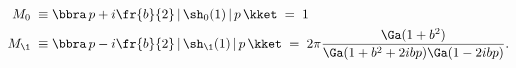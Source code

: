 \begin{equation}\label{m_el}\begin{aligned}
M_0\;\equiv\;&\bbra \,p+i\fr{b}{2}\,|\,\sh_0(1)\,|\,p\,\kket\;=\;1\\
M_\1\;\equiv\;&\bbra \,p-i\fr{b}{2}\,|\,\sh_\1(1)\,|\,p\,\kket\;=\;2\pi 
\frac{\Ga(1+b^2)}{\Ga(1+b^2+2ibp)\Ga(1-2ibp)}.
\end{aligned}\end{equation}

